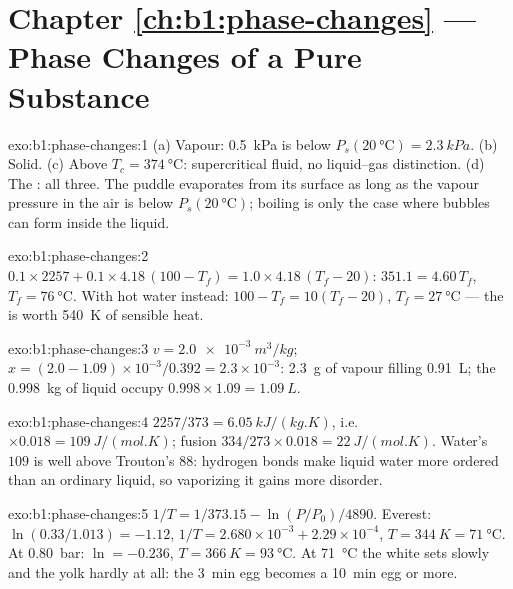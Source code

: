 \section*{Chapter \ref{ch:b1:phase-changes} --- Phase Changes of a Pure Substance}

\begin{solution}{exo:b1:phase-changes:1}
(a) Vapour: \qty{0.5}{kPa} is below $P_s(\qty{20}{\degreeCelsius}) = \qty{2.3}{kPa}$.
(b) Solid. (c) Above $T_c = \qty{374}{\degreeCelsius}$: supercritical fluid, no
liquid--gas distinction. (d) The : all three. The puddle
evaporates from its surface as long as the vapour pressure in the air
is below $P_s(\qty{20}{\degreeCelsius})$; boiling is only the case where
bubbles can form inside the liquid.
\end{solution}

\begin{solution}{exo:b1:phase-changes:2}
$0.1 \times 2257 + 0.1 \times 4.18\,(100 - T_f) = 1.0 \times 4.18\,(T_f - 20)$:
$351.1 = 4.60\,T_f$, $T_f = \qty{76}{\degreeCelsius}$. With hot water
instead: $100 - T_f = 10(T_f - 20)$, $T_f = \qty{27}{\degreeCelsius}$ --- the
 is worth \qty{540}{K} of sensible heat.
\end{solution}

\begin{solution}{exo:b1:phase-changes:3}
$v = \qty{2.0e-3}{m^3/kg}$; $x = (2.0 - 1.09) \times 10^{-3}/0.392 = 2.3 \times 10^{-3}$:
\qty{2.3}{g} of vapour filling \qty{0.91}{L}; the \qty{0.998}{kg} of liquid
occupy $0.998 \times 1.09 = \qty{1.09}{L}$.
\end{solution}

\begin{solution}{exo:b1:phase-changes:4}
$2257/373 = \qty{6.05}{kJ/(kg.K)}$, i.e.\ $\times 0.018 = \qty{109}{J/(mol.K)}$;
fusion $334/273 \times 0.018 = \qty{22}{J/(mol.K)}$. Water's $109$ is well
above Trouton's $88$: hydrogen bonds make liquid water more ordered
than an ordinary liquid, so vaporizing it gains more disorder.
\end{solution}

\begin{solution}{exo:b1:phase-changes:5}
$1/T = 1/373.15 - \ln(P/P_0)/4890$. Everest: $\ln(0.33/1.013) = -1.12$,
$1/T = 2.680 \times 10^{-3} + 2.29 \times 10^{-4}$, $T = \qty{344}{K} =
\qty{71}{\degreeCelsius}$. At \qty{0.80}{bar}: $\ln = -0.236$, $T = \qty{366}{K} =
\qty{93}{\degreeCelsius}$. At \qty{71}{\degreeCelsius} the white sets slowly
and the yolk hardly at all: the \qty{3}{min} egg becomes a
\qty{10}{min} egg or more.
\end{solution}

